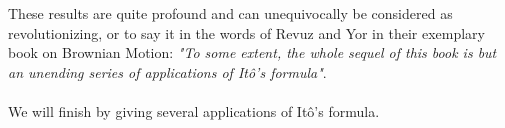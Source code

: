 \documentclass[11pt,a4paper, final]{article}
\theoremstyle{definition}
\begin{document}
\noindent These results are quite profound and can unequivocally be considered as revolutionizing, or to say it in the words of Revuz and Yor in their exemplary book on Brownian Motion: \textit{"To some extent, the whole sequel of this book is but an unending series of applications of Itô's formula"}.
\\\\
We will finish by giving several applications of Itô's formula. 
\end{document}
